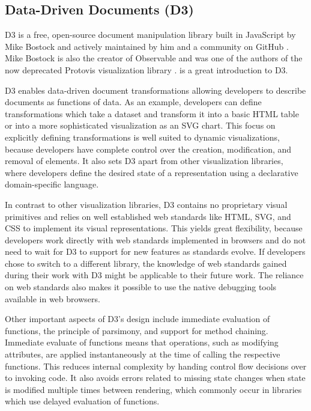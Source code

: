 \subsection{Data-Driven Documents (D3)}

D3 \parencite{D3} is a free, open-source document manipulation library
built in JavaScript by Mike Bostock and actively maintained by him and
a community on GitHub \parencite{D3JS}. Mike Bostock is also the
creator of Observable \parencite{Observable} and was one of the
authors of the now deprecated Protovis visualization library
\parencite{Protovis}. \textcite{Wattenberger-D3} is a great
introduction to D3.

D3 enables data-driven document transformations allowing developers to
describe documents as functions of data. As an example, developers can
define transformations which take a dataset and transform it into a
basic HTML table or into a more sophisticated visualization as an SVG
chart. This focus on explicitly defining transformations is well
suited to dynamic visualizations, because developers have complete
control over the creation, modification, and removal of elements. It
also sets D3 apart from other visualization libraries, where
developers define the desired state of a representation using a
declarative domain-specific language.

In contrast to other visualization libraries, D3 contains no
proprietary visual primitives and relies on well established web
standards like HTML, SVG, and CSS to implement its visual
representations. This yields great flexibility, because developers
work directly with web standards implemented in browsers and do not
need to wait for D3 to support for new features as standards
evolve. If developers chose to switch to a different library, the
knowledge of web standards gained during their work with D3 might be
applicable to their future work. The reliance on web standards also
makes it possible to use the native debugging tools available in web
browsers.


Other important aspects of D3's design include immediate evaluation of
functions, the principle of parsimony, and support for method
chaining. Immediate evaluate of functions means that operations, such
as modifying attributes, are applied instantaneously at the time of
calling the respective functions. This reduces internal complexity by
handing control flow decisions over to invoking code. It also avoids
errors related to missing state changes when state is modified
multiple times between rendering, which commonly occur in libraries
which use delayed evaluation of functions.

